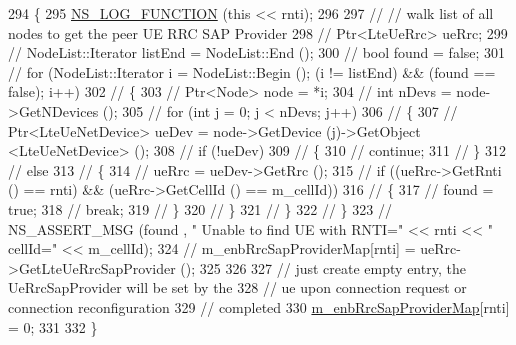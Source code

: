 \begin{DoxyCode}
294 \{
295   \hyperlink{log-macros-disabled_8h_a90b90d5bad1f39cb1b64923ea94c0761}{NS\_LOG\_FUNCTION} (\textcolor{keyword}{this} << rnti);
296 
297   \textcolor{comment}{// // walk list of all nodes to get the peer UE RRC SAP Provider}
298   \textcolor{comment}{// Ptr<LteUeRrc> ueRrc;}
299   \textcolor{comment}{// NodeList::Iterator listEnd = NodeList::End ();}
300   \textcolor{comment}{// bool found = false;}
301   \textcolor{comment}{// for (NodeList::Iterator i = NodeList::Begin (); (i != listEnd) && (found == false); i++)}
302   \textcolor{comment}{//   \{}
303   \textcolor{comment}{//     Ptr<Node> node = *i;}
304   \textcolor{comment}{//     int nDevs = node->GetNDevices ();}
305   \textcolor{comment}{//     for (int j = 0; j < nDevs; j++)}
306   \textcolor{comment}{//       \{}
307   \textcolor{comment}{//         Ptr<LteUeNetDevice> ueDev = node->GetDevice (j)->GetObject <LteUeNetDevice> ();}
308   \textcolor{comment}{//         if (!ueDev)}
309   \textcolor{comment}{//           \{}
310   \textcolor{comment}{//             continue;}
311   \textcolor{comment}{//           \}}
312   \textcolor{comment}{//         else}
313   \textcolor{comment}{//           \{}
314   \textcolor{comment}{//             ueRrc = ueDev->GetRrc ();}
315   \textcolor{comment}{//             if ((ueRrc->GetRnti () == rnti) && (ueRrc->GetCellId () == m\_cellId))}
316   \textcolor{comment}{//               \{                 }
317   \textcolor{comment}{//              found = true;}
318   \textcolor{comment}{//              break;}
319   \textcolor{comment}{//               \}}
320   \textcolor{comment}{//           \}}
321   \textcolor{comment}{//       \}}
322   \textcolor{comment}{//   \}}
323   \textcolor{comment}{// NS\_ASSERT\_MSG (found , " Unable to find UE with RNTI=" << rnti << " cellId=" << m\_cellId);}
324   \textcolor{comment}{// m\_enbRrcSapProviderMap[rnti] = ueRrc->GetLteUeRrcSapProvider ();}
325 
326 
327   \textcolor{comment}{// just create empty entry, the UeRrcSapProvider will be set by the}
328   \textcolor{comment}{// ue upon connection request or connection reconfiguration}
329   \textcolor{comment}{// completed }
330   \hyperlink{classns3_1_1LteEnbRrcProtocolIdeal_a77d0bd25d54009ce65f00acf765dd714}{m\_enbRrcSapProviderMap}[rnti] = 0;
331 
332 \}
\end{DoxyCode}
